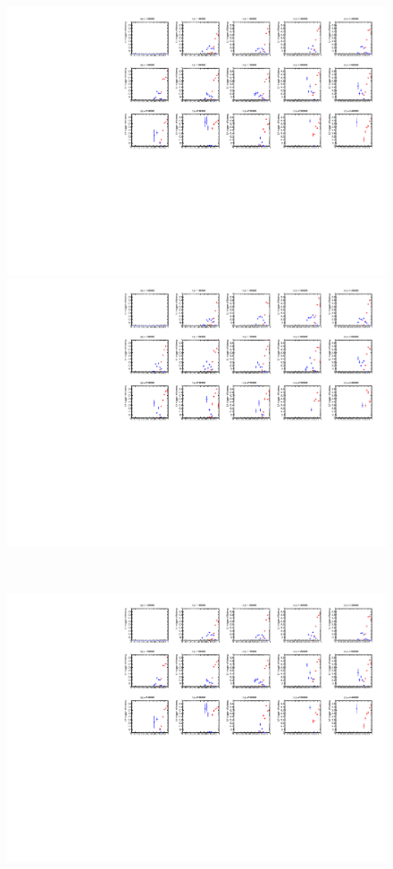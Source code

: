 \begin{figure}[tbp]
    \begin{minipage}{0.49\hsize}
    \centering   
    \includegraphics[width=\textwidth,page=16]{img/rec/stau_600.pdf}
    \end{minipage}
    \begin{minipage}{0.49\hsize}
    \centering   
    \includegraphics[width=\textwidth,page=16]{img/rec/stau_1000.pdf}
    \end{minipage}\\
    \begin{minipage}{0.49\hsize}
    \centering   
    \includegraphics[width=\textwidth,page=15]{img/rec/stau_600.pdf}

\end{minipage}
\end{figure}
